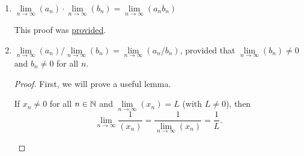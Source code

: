 \begin{problem}
\begin{enumerate}[label=(\alph*)]
\begin{proof}
          Combining the result of \ref{prob:sum-limit-law} and
           (viz., letting $c = -1$) completes the proof.
        \end{proof}

      \item $\lim\limits_{n \to \infty} {(a_{n})} \cdot \lim\limits_{n \to \infty} {(b_{n})} = \lim\limits_{n \to \infty} {(a_{n}b_{n})}$ 
        \label{prob:product-limit-law}

        \begin{callout}
          This proof was \href{https://youtu.be/Q7MzeAaL7bU?si=uc3L6lvpQXdKwMGI&t=691}{provided}.
        \end{callout}

      \item $\lim\limits_{n \to \infty} {(a_{n})} / \lim\limits_{n \to \infty} {(b_{n})} = \lim\limits_{n \to \infty} {(a_{n} / b_{n})}$, provided that $\lim\limits_{n \to \infty} ({b_{n}}) \neq 0$
        and $b_{n} \neq 0$ for all $n$.
        \label{prob:division-limit-law}

        \begin{proof}
          First, we will prove a useful lemma.

          \begin{lemma}
            \label{lem:reciprocals-limit-law}
            If $x_{n} \neq 0$ for all $n \in \mathbb{N}$ and $\lim\limits_{n \to \infty} (x_{n}) = L$ (with $L \neq 0$), then
            \[
              \lim\limits_{n \to \infty} \dfrac{1}{(x_{n})} = \dfrac{1}{\lim\limits_{n \to \infty} (x_{n})} = \dfrac{1}{L}.
            \]
          \end{lemma}


\end{proof}
\end{enumerate}
\end{problem}

